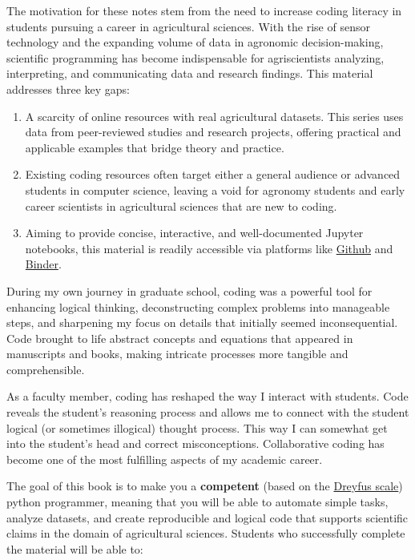 \documentclass[
]{book}
\theoremstyle{definition}
\theoremstyle{definition}
\theoremstyle{definition}
\theoremstyle{definition}
\theoremstyle{remark}
\begin{document}
The motivation for these notes stem from the need to increase coding literacy in students pursuing a career in agricultural sciences. With the rise of sensor technology and the expanding volume of data in agronomic decision-making, scientific programming has become indispensable for agriscientists analyzing, interpreting, and communicating data and research findings. This material addresses three key gaps:

\begin{enumerate}
\def\labelenumi{\arabic{enumi}.}
\item
  A scarcity of online resources with real agricultural datasets. This series uses data from peer-reviewed studies and research projects, offering practical and applicable examples that bridge theory and practice.
\item
  Existing coding resources often target either a general audience or advanced students in computer science, leaving a void for agronomy students and early career scientists in agricultural sciences that are new to coding.
\item
  Aiming to provide concise, interactive, and well-documented Jupyter notebooks, this material is readily accessible via platforms like \href{https://github.com/}{Github} and \href{https://mybinder.org/}{Binder}.
\end{enumerate}

During my own journey in graduate school, coding was a powerful tool for enhancing logical thinking, deconstructing complex problems into manageable steps, and sharpening my focus on details that initially seemed inconsequential. Code brought to life abstract concepts and equations that appeared in manuscripts and books, making intricate processes more tangible and comprehensible.

As a faculty member, coding has reshaped the way I interact with students. Code reveals the student's reasoning process and allows me to connect with the student logical (or sometimes illogical) thought process. This way I can somewhat get into the student's head and correct misconceptions. Collaborative coding has become one of the most fulfilling aspects of my academic career.

The goal of this book is to make you a \textbf{competent} (based on the \href{https://doi.org/10.1177/0270467604264992}{Dreyfus scale}) python programmer, meaning that you will be able to automate simple tasks, analyze datasets, and create reproducible and logical code that supports scientific claims in the domain of agricultural sciences. Students who successfully complete the material will be able to:
\end{document}
